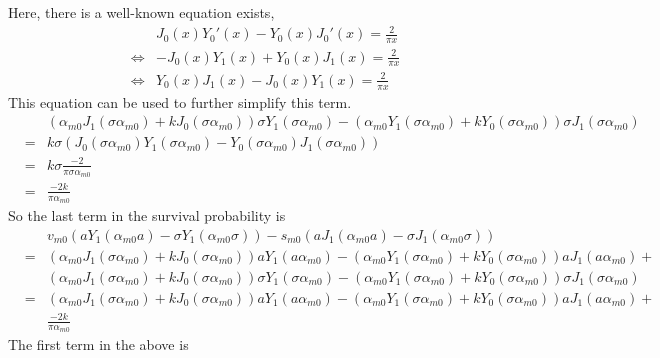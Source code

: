 \documentclass{article}
\begin{document}
%
Here, there is a well-known equation exists,
%
\begin{eqnarray}
    & &                J_0(x)Y_0'(x) - Y_0(x)J_0'(x) = \frac{2}{\pi x} \nonumber\\
    &\Leftrightarrow& -J_0(x)Y_1 (x) + Y_0(x)J_1 (x) = \frac{2}{\pi x} \nonumber\\
    &\Leftrightarrow&  Y_0(x)J_1 (x) - J_0(x)Y_1 (x) = \frac{2}{\pi x} \nonumber
\end{eqnarray}
%
This equation can be used to further simplify this term.
%
\begin{eqnarray}
    & & (\alpha_{m0}J_1(\sigma\alpha_{m0}) + kJ_0(\sigma\alpha_{m0}))\sigma Y_1(\sigma\alpha_{m0}) -
        (\alpha_{m0}Y_1(\sigma\alpha_{m0}) + kY_0(\sigma\alpha_{m0}))\sigma J_1(\sigma\alpha_{m0})
        \nonumber\\
    &=& k\sigma (J_0(\sigma\alpha_{m0}) Y_1(\sigma\alpha_{m0}) -
                 Y_0(\sigma\alpha_{m0}) J_1(\sigma\alpha_{m0}))
        \nonumber\\
    &=& k\sigma\frac{-2}{\pi\sigma\alpha_{m0}}
        \nonumber\\
    &=& \frac{-2k}{\pi\alpha_{m0}}
\end{eqnarray}
%
So the last term in the survival probability is
%
\begin{eqnarray}
    & & v_{m0} \left(aY_1(\alpha_{m0}a) - \sigma Y_1(\alpha_{m0}\sigma)\right) -
        s_{m0} \left(aJ_1(\alpha_{m0}a) - \sigma J_1(\alpha_{m0}\sigma)\right)
        \nonumber\\
    &=& (\alpha_{m0}J_1(\sigma\alpha_{m0}) + kJ_0(\sigma\alpha_{m0}))a      Y_1(a\alpha_{m0}) -
        (\alpha_{m0}Y_1(\sigma\alpha_{m0}) + kY_0(\sigma\alpha_{m0}))a      J_1(a\alpha_{m0}) +
        \nonumber\\
    & & (\alpha_{m0}J_1(\sigma\alpha_{m0}) + kJ_0(\sigma\alpha_{m0}))\sigma Y_1(\sigma\alpha_{m0}) -
        (\alpha_{m0}Y_1(\sigma\alpha_{m0}) + kY_0(\sigma\alpha_{m0}))\sigma J_1(\sigma\alpha_{m0})
        \nonumber\\
    &=& (\alpha_{m0}J_1(\sigma\alpha_{m0}) + kJ_0(\sigma\alpha_{m0}))a      Y_1(a\alpha_{m0}) -
        (\alpha_{m0}Y_1(\sigma\alpha_{m0}) + kY_0(\sigma\alpha_{m0}))a      J_1(a\alpha_{m0}) +
        \nonumber\\
    & & \frac{-2k}{\pi\alpha_{m0}}
\end{eqnarray}
%
The first term in the above is
%
\end{document}
